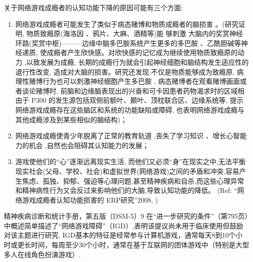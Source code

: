  关于网络游戏成瘾者的认知功能下降的原因可能有三个方面:
\begin{enumerate}
\item 网络游戏成瘾者可能发生了类似于病态赌博和物质成瘾者的脑损害 。(研究证明, 物质致瘾原(海洛因 、鸦片、大麻、酒精等)能 够刺激 大脑内的奖赏神经环路(奖赏中枢)———边缘中脑多巴胺系统产生更多的多巴胺 、乙酰胆碱等神经递质, 使成瘾者产生欣快感。对欣快感的记忆成为继续使用物质致瘾原的动力 ,以致发展为成瘾, 长期的成瘾行为就会引起神经细胞和脑结构发生适应性的退行性改变, 造成对大脑的损害。研究还发现,不仅是物质能够成为致瘾原, 病理性赌博行为也可以刺激神经细胞产生多巴胺 , 病态赌博者在观看赌博画面或者谈论赌博时, 前脑和边缘脑表现出的兴奋和可卡因患者药物渴求时的区域相由于 P300 的发生源包括双侧前额叶、颞叶、顶枕联合区、边缘系统等, 提示网络游戏成瘾存在这些脑区和系统的功能缺陷或障碍, 也表明网络游戏成瘾与其他成瘾涉及到某些相似的脑结构)；
\item 网络游戏成瘾使青少年脱离了正常的教育轨道 ,丧失了学习知识 、增长心智能力的机会 ,自然也会阻碍其认知能力的发展；
\item  游戏使他们的“心”逐渐远离现实生活, 而他们又必须“身”在现实之中,无法平衡现实社会(父母、学校、社会)和虚拟世界(网络游戏)之间的矛盾和冲突,容易产生焦虑、孤独、抑郁、强迫等心理问题,甚至精神疾病和自杀,而这些心理异常和精神病性行为又会反过来影响他们的大脑,导致认知功能的降低。
                (Ref:   “网络游戏成瘾者认知功能损害的 ERP研究”2008, \cite{})
 \end{enumerate}





精神疾病诊断和统计手册，第五版（DSM-5）9 在“进一步研究的条件”（第795页）中概述简单描述了“网络游戏障碍”（IGD）,表明该提议尚未用于临床使用但鼓励对该主题进行研究. IGD基本的特征是经常参与计算机游戏，通常每天8到10个小时或更长时间，每周至少30个小时，通常在基于互联网的团体游戏中（特别是大型多人在线角色扮演游戏）.




